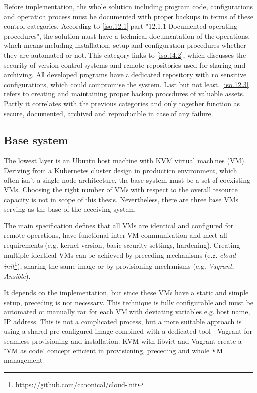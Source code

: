 Before implementation, the whole solution including program code, configurations and operation process must be documented with proper backups in terms of these control categories. According to \ref{iso.12.1} part "12.1.1 Documented operating procedures", the solution must have a technical documentation of the operations, which means including installation, setup and configuration procedures whether they are automated or not. This category links to \ref{iso.14.2}, which discusses the security of version control systems and remote repositories used for sharing and archiving. All developed programs have a dedicated repository with no sensitive configurations, which could compromise the system. Last but not least, \ref{iso.12.3} refers to creating and maintaining proper backup procedures of valuable assets. Partly it correlates with the previous categories and only together function as secure, documented, archived and reproducible in case of any failure.

\subsection{Base system \label{design:env-arch:base}}
The lowest layer is an Ubuntu host machine with KVM virtual machines (VM). Deriving from a Kubernetes cluster design in production environment, which often isn't a single-node architecture, the base system must be a set of coexisting VMs. Choosing the right number of VMs with respect to the overall resource capacity is not in scope of this thesis. Nevertheless, there are three base VMs serving as the base of the deceiving system.

The main specification defines that all VMs are identical and configured for remote operations, have functional inter-VM communication and meet all requirements (e.g. kernel version, basic security settings, hardening). Creating multiple identical VMs can be achieved by preceding mechanisms (e.g. \textit{cloud-init}\footnote{\url{https://github.com/canonical/cloud-init}}), sharing the same image or by provisioning mechanisms (e.g. \textit{Vagrant}, \textit{Ansible}).

It depends on the implementation, but since these VMs have a static and simple setup, preceding is not necessary. This technique is fully configurable and must be automated or manually ran for each VM with deviating variables e.g. host name, IP address. This is not a complicated process, but a more suitable approach is using a shared pre-configured image combined with a dedicated tool - Vagrant for seamless provisioning and installation. KVM with libvirt and Vagrant create a "VM as code" concept efficient in provisioning, preceding and whole VM management.

